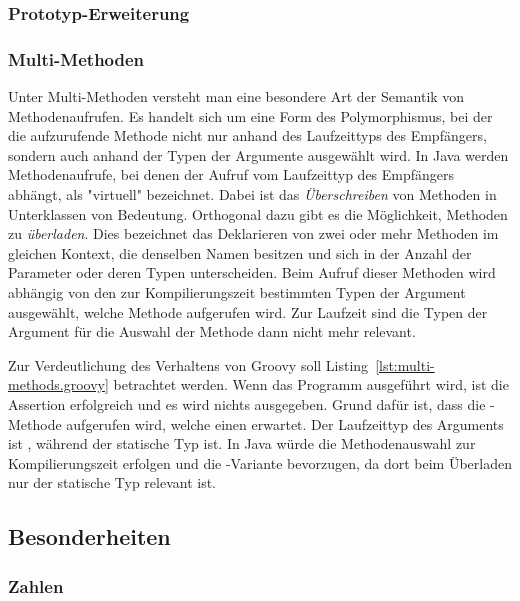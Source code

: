 	\subsubsection{Prototyp-Erweiterung}

	\subsubsection{Multi-Methoden}

	Unter Multi-Methoden versteht man eine besondere Art der Semantik von Methodenaufrufen.
	Es handelt sich um eine Form des Polymorphismus, bei der die aufzurufende Methode nicht nur anhand des Laufzeittyps des Empfängers, sondern auch anhand der Typen der Argumente ausgewählt wird.
	In Java werden Methodenaufrufe, bei denen der Aufruf vom Laufzeittyp des Empfängers abhängt, als "virtuell" bezeichnet.
	Dabei ist das \emph{Überschreiben} von Methoden in Unterklassen von Bedeutung.
	Orthogonal dazu gibt es die Möglichkeit, Methoden zu \emph{überladen}.
	Dies bezeichnet das Deklarieren von zwei oder mehr Methoden im gleichen Kontext, die denselben Namen besitzen und sich in der Anzahl der Parameter oder deren Typen unterscheiden.
	Beim Aufruf dieser Methoden wird abhängig von den zur Kompilierungszeit bestimmten Typen der Argument ausgewählt, welche Methode aufgerufen wird.
	Zur Laufzeit sind die Typen der Argument für die Auswahl der Methode dann nicht mehr relevant.


	Zur Verdeutlichung des Verhaltens von Groovy soll Listing~\ref{lst:multi-methods.groovy} betrachtet werden.
	Wenn das Programm ausgeführt wird, ist die Assertion erfolgreich und es wird nichts ausgegeben.
	Grund dafür ist, dass die -Methode aufgerufen wird, welche einen  erwartet.
	Der Laufzeittyp des Arguments  ist , während der statische Typ  ist.
	In Java würde die Methodenauswahl zur Kompilierungszeit erfolgen und die -Variante bevorzugen, da dort beim Überladen nur der statische Typ relevant ist.

	\subsection{Besonderheiten}\label{subsec:besonderheiten}

	\subsubsection{Zahlen}\label{subsubsec:zahlen}

